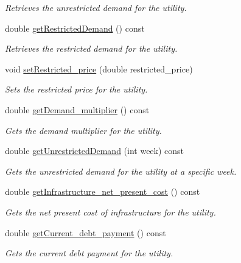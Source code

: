 \begin{DoxyCompactItemize}
\begin{DoxyCompactList}\small\item\em Retrieves the unrestricted demand for the utility. \end{DoxyCompactList}\item 
double \mbox{\hyperlink{classUtility_ade3427a88355631a3657f752ace874fc}{get\+Restricted\+Demand}} () const
\begin{DoxyCompactList}\small\item\em Retrieves the restricted demand for the utility. \end{DoxyCompactList}\item 
void \mbox{\hyperlink{classUtility_a7f642d886a6d1d165e86b2e6a7c51ed4}{set\+Restricted\+\_\+price}} (double restricted\+\_\+price)
\begin{DoxyCompactList}\small\item\em Sets the restricted price for the utility. \end{DoxyCompactList}\item 
double \mbox{\hyperlink{classUtility_a04a400d8bfb89214632f9afca8c4eef5}{get\+Demand\+\_\+multiplier}} () const
\begin{DoxyCompactList}\small\item\em Gets the demand multiplier for the utility. \end{DoxyCompactList}\item 
double \mbox{\hyperlink{classUtility_ae2d1b744d965d9b916dd7d3103631c92}{get\+Unrestricted\+Demand}} (int week) const
\begin{DoxyCompactList}\small\item\em Gets the unrestricted demand for the utility at a specific week. \end{DoxyCompactList}\item 
double \mbox{\hyperlink{classUtility_ab806fee785718cbc82b1963316785448}{get\+Infrastructure\+\_\+net\+\_\+present\+\_\+cost}} () const
\begin{DoxyCompactList}\small\item\em Gets the net present cost of infrastructure for the utility. \end{DoxyCompactList}\item 
double \mbox{\hyperlink{classUtility_ab0e6984f9bad9d5d2a756f015216f54f}{get\+Current\+\_\+debt\+\_\+payment}} () const
\begin{DoxyCompactList}\small\item\em Gets the current debt payment for the utility. \end{DoxyCompactList}\item 

\end{DoxyCompactItemize}
